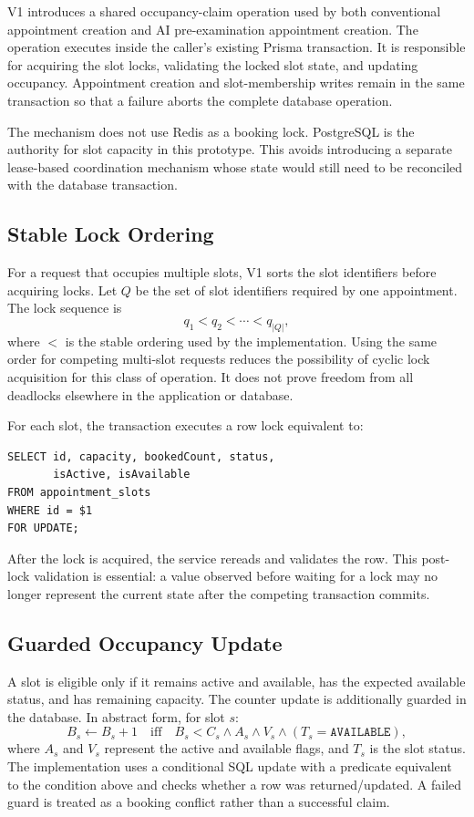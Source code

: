 \documentclass[conference]{IEEEtran}
\begin{document}
V1 introduces a shared occupancy-claim operation used by both conventional appointment creation and AI pre-examination appointment creation. The operation executes inside the caller's existing Prisma transaction. It is responsible for acquiring the slot locks, validating the locked slot state, and updating occupancy. Appointment creation and slot-membership writes remain in the same transaction so that a failure aborts the complete database operation.

The mechanism does not use Redis as a booking lock. PostgreSQL is the authority for slot capacity in this prototype. This avoids introducing a separate lease-based coordination mechanism whose state would still need to be reconciled with the database transaction.

\subsection{Stable Lock Ordering}
For a request that occupies multiple slots, V1 sorts the slot identifiers before acquiring locks. Let $Q$ be the set of slot identifiers required by one appointment. The lock sequence is
\begin{equation}
q_1 < q_2 < \cdots < q_{|Q|},
\label{eq:lockorder}
\end{equation}
where $<$ is the stable ordering used by the implementation. Using the same order for competing multi-slot requests reduces the possibility of cyclic lock acquisition for this class of operation. It does not prove freedom from all deadlocks elsewhere in the application or database.

For each slot, the transaction executes a row lock equivalent to:
\begin{verbatim}
SELECT id, capacity, bookedCount, status,
       isActive, isAvailable
FROM appointment_slots
WHERE id = $1
FOR UPDATE;
\end{verbatim}
After the lock is acquired, the service rereads and validates the row. This post-lock validation is essential: a value observed before waiting for a lock may no longer represent the current state after the competing transaction commits.

\subsection{Guarded Occupancy Update}
A slot is eligible only if it remains active and available, has the expected available status, and has remaining capacity. The counter update is additionally guarded in the database. In abstract form, for slot $s$:
\begin{equation}
B_s \leftarrow B_s + 1
\quad\text{iff}\quad
B_s < C_s \land A_s \land V_s \land (T_s=\texttt{AVAILABLE}),
\label{eq:guard}
\end{equation}
where $A_s$ and $V_s$ represent the active and available flags, and $T_s$ is the slot status. The implementation uses a conditional SQL update with a predicate equivalent to the condition above and checks whether a row was returned/updated. A failed guard is treated as a booking conflict rather than a successful claim.
\end{document}
